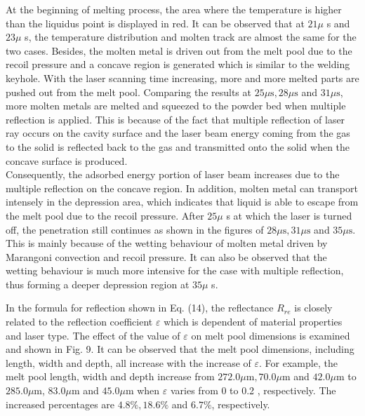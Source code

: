 \documentclass[10pt]{article}
\begin{document}
At the beginning of melting process, the area where the temperature is higher than the liquidus point is displayed in red. It can be observed that at $21 \mu$ s and $23 \mu$ s, the temperature distribution and molten track are almost the same for the two cases. Besides, the molten metal is driven out from the melt pool due to the recoil pressure and a concave region is generated which is similar to the welding keyhole. With the laser scanning time increasing, more and more melted parts are pushed out from the melt pool. Comparing the results at $25 \mu \mathrm{s}, 28 \mu \mathrm{s}$ and $31 \mu \mathrm{s}$, more molten metals are melted and squeezed to the powder bed when multiple reflection is applied. This is because of the fact that multiple reflection of laser ray occurs on the cavity surface and the laser beam energy coming from the gas to the solid is reflected back to the gas and transmitted onto the solid when the concave surface is produced.\\
Consequently, the adsorbed energy portion of laser beam increases due to the multiple reflection on the concave region. In addition, molten metal can transport intensely in the depression area, which indicates that liquid is able to escape from the melt pool due to the recoil pressure. After $25 \mu$ s at which the laser is turned off, the penetration still continues as shown in the figures of $28 \mu \mathrm{s}, 31 \mu \mathrm{s}$ and $35 \mu \mathrm{s}$. This is mainly because of the wetting behaviour of molten metal driven by Marangoni convection and recoil pressure. It can also be observed that the wetting behaviour is much more intensive for the case with multiple reflection, thus forming a deeper depression region at $35 \mu$ s.

In the formula for reflection shown in Eq. (14), the reflectance $R_{r e}$ is closely related to the reflection coefficient $\varepsilon$ which is dependent of material properties and laser type. The effect of the value of $\varepsilon$ on melt pool dimensions is examined and shown in Fig. 9. It can be observed that the melt pool dimensions, including length, width and depth, all increase with the increase of $\varepsilon$. For example, the melt pool length, width and depth increase from $272.0 \mu \mathrm{m}, 70.0 \mu \mathrm{m}$ and $42.0 \mu \mathrm{m}$ to $285.0 \mu \mathrm{m}$, $83.0 \mu \mathrm{m}$ and $45.0 \mu \mathrm{m}$ when $\varepsilon$ varies from 0 to 0.2 , respectively. The increased percentages are $4.8 \%, 18.6 \%$ and $6.7 \%$, respectively.
\end{document}
